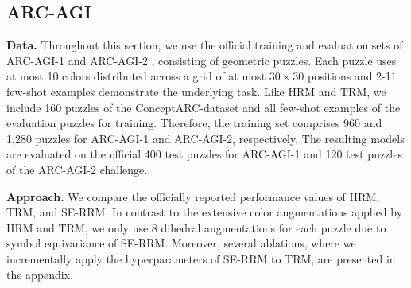 \documentclass{article}
\theoremstyle{plain}
\theoremstyle{definition}
\theoremstyle{remark}
\renewcommand{\paragraph}[1]{\textbf{#1}\;}
\begin{document}
\begin{table}[h]
\centering
\caption{pass@2 on ARC-AGI benchmarks and fully solved rate (FSR) on Maze with 95\% Wilson score confidence intervals.
Reported values for HRM and TRM are taken from the respective papers.}
\label{tab:arc_agi_maze_results}
\setlength{\tabcolsep}{6pt}
\renewcommand{\arraystretch}{1.15}
\end{table}



\subsection{ARC-AGI}
\paragraph{Data.} Throughout this section, we use the official training and evaluation sets of ARC-AGI-1 \cite{chollet2019measure} and ARC-AGI-2 \cite{chollet2025arc}, consisting of geometric puzzles.
Each puzzle uses at most 10 colors distributed across a grid of at most $30\times30$ positions and 2-11 few-shot examples demonstrate the underlying task.
Like HRM and TRM, we include 160 puzzles of the ConceptARC-dataset \citep{conceptarc} and all few-shot examples of the evaluation puzzles for training.
Therefore, the training set comprises 960 and 1,280 puzzles for ARC-AGI-1 and ARC-AGI-2, respectively.
The resulting models are evaluated on the official 400 test puzzles for ARC-AGI-1 and 120 test puzzles of the ARC-AGI-2 challenge.


\paragraph{Approach.} We compare the officially reported performance values of HRM, TRM, and SE-RRM. In contrast to the extensive color augmentations applied by HRM and TRM, we only use 8 dihedral augmentations for each puzzle due to symbol equivariance of SE-RRM. Moreover, several ablations, where we incrementally apply the hyperparameters of SE-RRM to TRM, are presented in the appendix.
\end{document}
